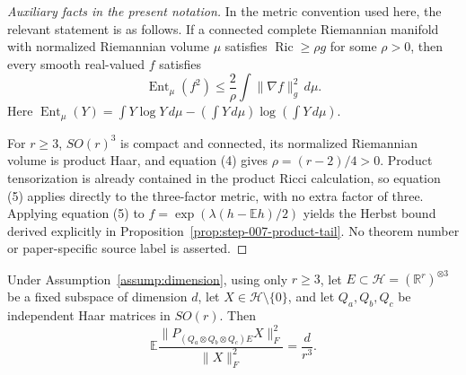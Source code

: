 \begin{proof}[Auxiliary facts in the present notation]
In the metric convention used here, the relevant statement is as follows. If a connected complete
Riemannian manifold with normalized Riemannian volume \(\mu\) satisfies
\(\operatorname{Ric}\ge\rho g\) for some \(\rho>0\), then every smooth
real-valued \(f\) satisfies
\[
  \operatorname{Ent}_\mu(f^2)
  \le \frac2\rho\int\|\nabla f\|_g^2\,d\mu.                \tag{5}
\]
Here
\(\operatorname{Ent}_\mu(Y)=\int Y\log Y\,d\mu
-(\int Y\,d\mu)\log(\int Y\,d\mu)\).

For \(r\ge3\),
\(SO(r)^3\) is compact and connected, its normalized Riemannian volume is
product Haar, and equation (4) gives
\(\rho=(r-2)/4>0\). Product tensorization is already contained in the product
Ricci calculation, so equation (5) applies directly to the three-factor
metric, with no extra factor of three. Applying equation (5) to
\(f=\exp(\lambda(h-\mathbb Eh)/2)\) yields the Herbst bound derived explicitly
in Proposition~\ref{prop:step-007-product-tail}. No theorem number or
paper-specific source label is asserted.

\end{proof}



\begin{lemma}
\label{lem:step-007-sequential-twirl}
Under Assumption~\ref{assump:dimension}, using only \(r\ge3\), let
\(E\subset\mathcal H=(\mathbb R^r)^{\otimes3}\) be a fixed subspace of
dimension \(d\), let \(X\in\mathcal H\setminus\{0\}\), and let
\(Q_a,Q_b,Q_c\) be independent Haar matrices in \(SO(r)\). Then
\[
  \mathbb E\frac{\|P_{(Q_a\otimes Q_b\otimes Q_c)E}X\|_F^2}
  {\|X\|_F^2}
  =\frac d{r^3}.                                             \tag{6}
\]

\end{lemma}

